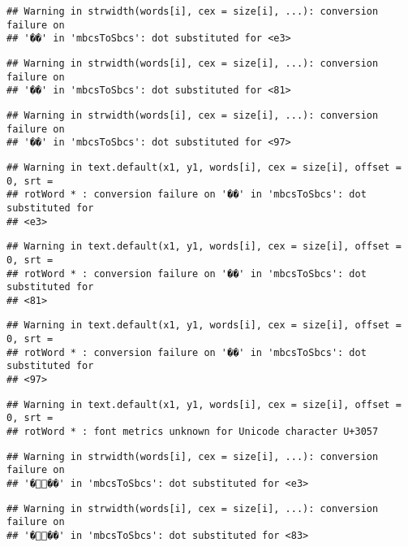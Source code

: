 \documentclass[]{article}
\begin{document}
\begin{verbatim}
## Warning in strwidth(words[i], cex = size[i], ...): conversion failure on
## '��' in 'mbcsToSbcs': dot substituted for <e3>
\end{verbatim}

\begin{verbatim}
## Warning in strwidth(words[i], cex = size[i], ...): conversion failure on
## '��' in 'mbcsToSbcs': dot substituted for <81>
\end{verbatim}

\begin{verbatim}
## Warning in strwidth(words[i], cex = size[i], ...): conversion failure on
## '��' in 'mbcsToSbcs': dot substituted for <97>
\end{verbatim}

\begin{verbatim}
## Warning in text.default(x1, y1, words[i], cex = size[i], offset = 0, srt =
## rotWord * : conversion failure on '��' in 'mbcsToSbcs': dot substituted for
## <e3>
\end{verbatim}

\begin{verbatim}
## Warning in text.default(x1, y1, words[i], cex = size[i], offset = 0, srt =
## rotWord * : conversion failure on '��' in 'mbcsToSbcs': dot substituted for
## <81>
\end{verbatim}

\begin{verbatim}
## Warning in text.default(x1, y1, words[i], cex = size[i], offset = 0, srt =
## rotWord * : conversion failure on '��' in 'mbcsToSbcs': dot substituted for
## <97>
\end{verbatim}

\begin{verbatim}
## Warning in text.default(x1, y1, words[i], cex = size[i], offset = 0, srt =
## rotWord * : font metrics unknown for Unicode character U+3057
\end{verbatim}

\begin{verbatim}
## Warning in strwidth(words[i], cex = size[i], ...): conversion failure on
## '���' in 'mbcsToSbcs': dot substituted for <e3>
\end{verbatim}

\begin{verbatim}
## Warning in strwidth(words[i], cex = size[i], ...): conversion failure on
## '���' in 'mbcsToSbcs': dot substituted for <83>
\end{verbatim}
\end{document}
